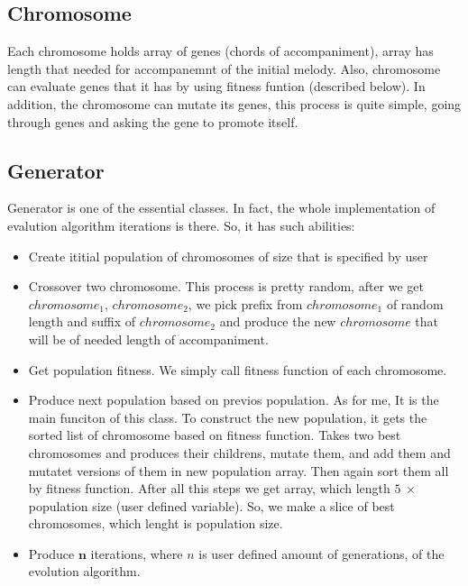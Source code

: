 \documentclass[a4paper]{article}
\begin{document}
\subsection{Chromosome}
Each chromosome holds array of genes (chords of accompaniment), array has length that needed for accompanemnt of the initial melody. Also, chromosome can evaluate genes that it has by using fitness funtion (described below). In addition, the chromosome can mutate its genes, this process is quite simple, going through genes and asking the gene to promote itself.
\subsection{Generator}
Generator is one of the essential classes. In fact, the whole implementation of evalution algorithm iterations is there. So, it has such abilities:

\begin{itemize}
    \item Create ititial population of chromosomes of size that is specified by user
    \item Crossover two chromosome. This process is pretty random, after we get $chromosome_1$, $chromosome_2$, we pick prefix from $chromosome_1$ of random length and suffix of $chromosome_2$ and produce the new $chromosome$ that will be of needed length of accompaniment.
    \item Get population fitness. We simply call fitness function of each chromosome.
    \item Produce next population based on previos population. As for me, It is the main funciton of this class. To construct the new population, it gets the sorted list of chromosome based on fitness function. Takes two best chromosomes and produces their childrens, mutate them, and add them and mutatet versions of them in new population array. Then again sort them all by fitness function. After all this steps we get array, which length $5 \ \times$ population size (user defined variable). So, we make a slice of best chromosomes, which lenght is population size. 
    \item Produce $\textbf{n}$ iterations, where $n$ is user defined amount of generations, of the evolution algorithm.
\end{itemize}
\end{document}
